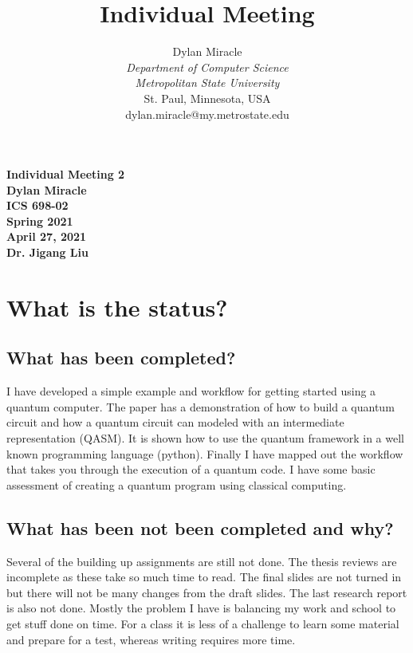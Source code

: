 \documentclass{article}
\begin{document}
\begin{titlepage}
    \begin{center}
        \vspace{4cm}
        \large
        \textbf{
            Individual Meeting 2 \\
            Dylan Miracle \\
            ICS 698-02 \\
            Spring 2021 \\
            April 27, 2021 \\
            Dr. Jigang Liu
        }
    \end{center}
\end{titlepage}
\title{Individual Meeting}

\author{Dylan Miracle\\
\textit{Department of Computer Science} \\
\textit{Metropolitan State University}\\
St. Paul, Minnesota, USA \\
dylan.miracle@my.metrostate.edu
}

\maketitle

\tableofcontents

\section{What is the status?}
\subsection{What has been completed?}
I have developed a simple example and workflow for getting started using a quantum computer. The paper has a demonstration of how to build a quantum circuit and how a quantum circuit can modeled with an intermediate representation (QASM). It is shown how to use the quantum framework in a well known programming language (python). Finally I have mapped out the workflow that takes you through the execution of a quantum code. I have some basic assessment of creating a quantum program using classical computing.

\subsection{What has been not been completed and why?}
Several of the building up assignments are still not done. The thesis reviews are incomplete as these take so much time to read. The final slides are not turned in but there will not be many changes from the draft slides. The last research report is also not done. Mostly the problem I have is balancing my work and school to get stuff done on time. For a class it is less of a challenge to learn some material and prepare for a test, whereas writing requires more time.
\end{document}
